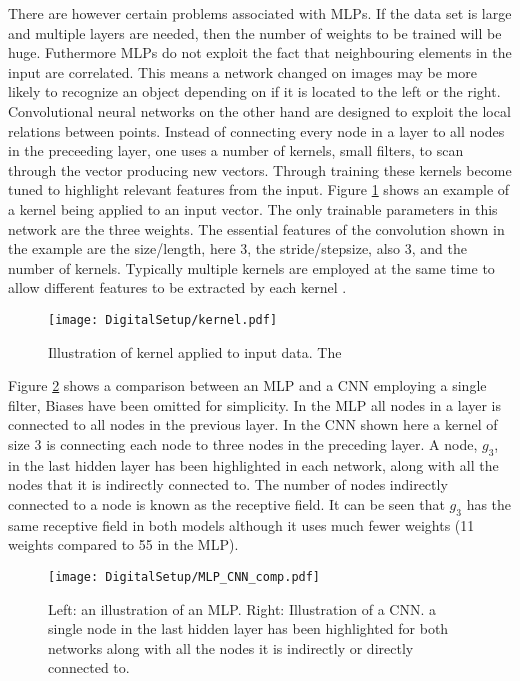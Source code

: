 \documentclass[main.tex]{subfiles}
\begin{document}
There are however certain problems associated with MLPs. If the data set is large and multiple layers are needed, then the number of weights to be trained will be huge. Futhermore MLPs do not exploit the fact that neighbouring elements in the input are correlated. This means a network changed on images may be more likely to recognize an object depending on if it is located to the left or the right. Convolutional neural networks on the other hand are designed to exploit the local relations between points. Instead of connecting every node in a layer to all nodes in the preceeding layer, one uses a number of kernels, small filters, to scan through the vector producing new vectors. Through training these kernels become tuned to highlight relevant features from the input. Figure \ref{fig:kernel} shows an example of a kernel being applied to an input vector. The only trainable parameters in this network are the three weights. 
The essential features of the convolution shown in the example are the size/length, here 3, the stride/stepsize, also 3, and the number of kernels. Typically multiple kernels are employed at the same time to allow different features to be extracted by each kernel \cite{Goodfellow-et-al-2016}.
\begin{figure}[ht!]
    \centering
        \texttt{[image: DigitalSetup/kernel.pdf]}
        \caption[Illustration of kernel applied to input data]{Illustration of kernel applied to input data. The }
    \label{fig:kernel} 
\end{figure}

Figure \ref{fig:MLP_CNN} shows a comparison between an MLP and a CNN employing a single filter, Biases have been omitted for simplicity. In the MLP all nodes in a layer is connected to all nodes in the previous layer. In the CNN shown here a kernel of size 3 is connecting each node to three nodes in the preceding layer. A node, $g_3$, in the last hidden layer has been highlighted in each network, along with all the nodes that it is indirectly connected to. The number of nodes indirectly connected to a node is known as the receptive field. It can be seen that $g_3$ has the same receptive field in both models although it uses much fewer weights (11 weights compared to 55 in the MLP).

\begin{figure}[ht!]
    \centering
        \texttt{[image: DigitalSetup/MLP\_CNN\_comp.pdf]}
        \caption[Illustration of MLP and CNN]{Left: an illustration of an MLP. Right: Illustration of a CNN. a single node in the last hidden layer has been highlighted for both networks along with all the nodes it is indirectly or directly connected to.}
    \label{fig:MLP_CNN} 
\end{figure}
\end{document}
